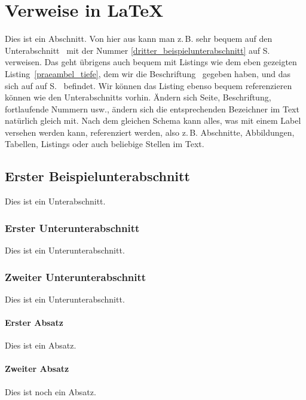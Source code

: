 \documentclass[12pt,oneside,a4paper,bibtotoc,liststotoc]{scrreprt}
\newcommand{\zB}{\mbox{z.\,B.}\xspace}
\begin{document}
\section{Verweise in \LaTeX}

Dies ist ein Abschnitt. Von hier aus kann man \zB sehr bequem auf den
Unterabschnitt \glqq {}\grqq\
mit der Nummer \ref{dritter_beispielunterabschnitt} auf
S.~\pageref{dritter_beispielunterabschnitt} verweisen. Das geht
übrigens auch bequem mit Listings wie dem eben gezeigten
Listing~\ref{praeambel_tiefe}, dem wir die Beschriftung \glqq
{}\grqq\ gegeben haben, und das sich auf auf
S.~\pageref{praeambel_tiefe} befindet. Wir können das Listing ebenso
bequem referenzieren können wie den Unterabschnitts vorhin. Ändern
sich Seite, Beschriftung, fortlaufende Nummern usw., ändern sich die
entsprechenden Bezeichner im Text natürlich gleich mit. Nach dem
gleichen Schema kann alles, was mit einem Label versehen werden kann,
referenziert werden, also \zB Abschnitte, Abbildungen, Tabellen,
Listings oder auch beliebige Stellen im Text.

\subsection{Erster Beispielunterabschnitt}

Dies ist ein Unterabschnitt.

\subsubsection{Erster Unterunterabschnitt}

Dies ist ein Unterunterabschnitt.

\subsubsection{Zweiter Unterunterabschnitt}

Dies ist ein Unterunterabschnitt.

\paragraph{Erster Absatz} Dies ist ein Absatz.

\paragraph{Zweiter Absatz} Dies ist noch ein Absatz.
\end{document}
